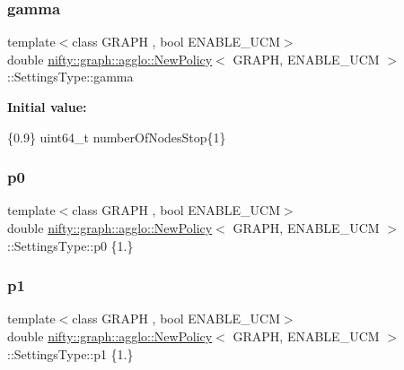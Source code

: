 \subsubsection{\texorpdfstring{gamma}{gamma}}
{\footnotesize\ttfamily template$<$class G\+R\+A\+PH , bool E\+N\+A\+B\+L\+E\+\_\+\+U\+CM$>$ \\
double \hyperlink{classnifty_1_1graph_1_1agglo_1_1NewPolicy}{nifty\+::graph\+::agglo\+::\+New\+Policy}$<$ G\+R\+A\+PH, E\+N\+A\+B\+L\+E\+\_\+\+U\+CM $>$\+::Settings\+Type\+::gamma}

{\bfseries Initial value\+:}
\begin{DoxyCode}
\{0.9\}
        uint64\_t numberOfNodesStop\{1\}
\end{DoxyCode}
\mbox{\label{structnifty_1_1graph_1_1agglo_1_1NewPolicy_1_1SettingsType_a025b23482a873dd935090ebb976a73f2}} 
\subsubsection{\texorpdfstring{p0}{p0}}
{\footnotesize\ttfamily template$<$class G\+R\+A\+PH , bool E\+N\+A\+B\+L\+E\+\_\+\+U\+CM$>$ \\
double \hyperlink{classnifty_1_1graph_1_1agglo_1_1NewPolicy}{nifty\+::graph\+::agglo\+::\+New\+Policy}$<$ G\+R\+A\+PH, E\+N\+A\+B\+L\+E\+\_\+\+U\+CM $>$\+::Settings\+Type\+::p0 \{1.\}}

\mbox{\label{structnifty_1_1graph_1_1agglo_1_1NewPolicy_1_1SettingsType_a8b111e990c73b02b5bc197221c4ec401}} 
\subsubsection{\texorpdfstring{p1}{p1}}
{\footnotesize\ttfamily template$<$class G\+R\+A\+PH , bool E\+N\+A\+B\+L\+E\+\_\+\+U\+CM$>$ \\
double \hyperlink{classnifty_1_1graph_1_1agglo_1_1NewPolicy}{nifty\+::graph\+::agglo\+::\+New\+Policy}$<$ G\+R\+A\+PH, E\+N\+A\+B\+L\+E\+\_\+\+U\+CM $>$\+::Settings\+Type\+::p1 \{1.\}}

